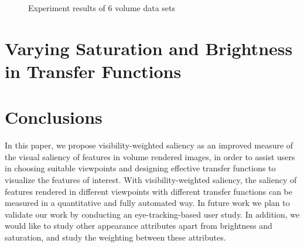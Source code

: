 \begin{figure}
\begin{minipage}{.24\textwidth}
		\subcaption{}
	\end{minipage}
	\caption{Experiment results of 6 volume data sets \cite{website:Roettger_volume_2013} \cite{website:Voreen_datasets_2013}}
	\label{fig:mos_vs_metric}
\end{figure}

\section{Varying Saturation and Brightness in Transfer Functions}


\section{Conclusions}
In this paper, we propose visibility-weighted saliency as an improved measure of the visual saliency of features in volume rendered images, in order to assist users in choosing suitable viewpoints and designing effective transfer functions to visualize the features of interest.
With visibility-weighted saliency, the saliency of features rendered in different viewpoints with different transfer functions can be measured in a quantitative and fully automated way.
In future work we plan to validate our work by conducting an eye-tracking-based user study. In addition, we would like to study other appearance attributes apart from brightness and saturation, and study the weighting between these attributes.
